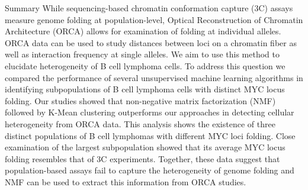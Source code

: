 \documentclass[landscape,a0paper,fontscale=0.285]{baposter} %
\begin{document}
\begin{poster}

\begin{posterbox}[name=section01, column=0, row=0, height=0.4375]{Summary}
While sequencing-based chromatin conformation capture (3C) assays measure genome folding at population-level, Optical Reconstruction of Chromatin Architecture (ORCA) allows for examination of folding at individual alleles. ORCA data can be used to study distances between loci on a chromatin fiber as well as interaction frequency at single alleles. We aim to use this method to elucidate heterogeneity of B cell lymphoma cells. To address this question we compared the performance of several unsupervised machine learning algorithms in identifying subpopulations of B cell lymphoma cells with distinct MYC locus folding. Our studies showed that non-negative matrix factorization (NMF) followed by K-Mean clustering outperforms our approaches in detecting cellular heterogeneity from ORCA data. This analysis shows the existence of three distinct populations of B cell lymphomas with different MYC loci folding. Close examination of the largest subpopulation showed that its average MYC locus folding resembles that of 3C experiments. Together, these data suggest that population-based assays fail to capture the heterogeneity of genome folding and NMF can be used to extract this information from ORCA studies. 
\vspace{0.2 cm}
\end{posterbox}



\end{poster}
\end{document}
